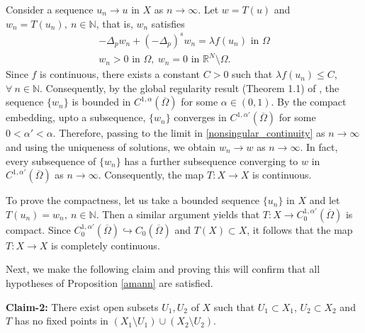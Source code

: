 \documentclass[reqno,oneside]{amsart}
\theoremstyle{definition}
\theoremstyle{remark}
\numberwithin{equation}{section}
\newcommand{\p}{\Delta_p}
\newcommand{\ps}{(-\Delta_p)^s}
\newcommand{\la} {\lambda}
\newcommand{\Om} {\Omega}
\newcommand{\rar}{\rightarrow}
\newcommand{\omc}{(\overline{\Om})}
\newcommand{\bdry}{\mathbb{R}^N \setminus \Omega}
\newcommand{\sn}{\mathbb{N}}
\begin{document}
Consider a sequence $u_n \rar u$ in $X$ as $n\rar\infty$. Let $w=T(u)$ and $w_n = T(u_n),\ n\in\sn$, that is, $w_n$ satisfies
\begin{equation}\label{nonsingular_continuity}
    \begin{aligned}
        -\p w_n + \ps w_n = \la f(u_n) \text{ in } \Om\\
        w_n >0 \text{ in } \Om,\ w_n = 0 \text{ in } \bdry.
    \end{aligned}
\end{equation}
Since $f$ is continuous, there exists a constant $C>0$ such that $\la f(u_n) \leq C$, $\forall\ n\in\sn$. Consequently, by the global regularity result (Theorem 1.1) of \cite{antonini2025global}, the sequence $\{ w_n\}$ is bounded in $C^{1,\alpha} \omc$ for some $\alpha \in (0,1)$. By the compact embedding, upto a subsequence, $\{ w_n\}$ converges in $C^{1,\alpha'} \omc$ for some $0<\alpha'<\alpha$. Therefore, passing to the limit in \eqref{nonsingular_continuity} as $n\rar\infty$ and using the uniqueness of solutions, we obtain $w_n \rar w$ as $n\rar\infty$. In fact, every subsequence of $\{w_n\}$ has a further subsequence converging to $w$ in $C^{1,\alpha'} \omc$ as $n\rar\infty$. Consequently, the map $T: X \rar X$ is continuous.

To prove the compactness, let us take a bounded sequence $\{u_n\}$ in $X$ and let $T(u_n) = w_n,\ n\in\sn$. Then a similar argument yields that $T: X \rar C^{1,\alpha'}_0 \omc$ is compact. Since $C^{1,\alpha'}_0 \omc \hookrightarrow C_0 \omc$ and $T(X) \subset X$, it follows that the map $T: X \rar X$ is completely continuous.

Next, we make the following claim and proving this will confirm that all hypotheses of Proposition \ref{amann} are satisfied.

\noindent\textbf{Claim-2:} There exist open subsets $U_1, U_2$ of $X$ such that $U_1 \subset X_1$, $U_2 \subset X_2$ and $T$ has no fixed points in $(X_1 \setminus U_1) \cup (X_2 \setminus U_2)$.
\end{document}
